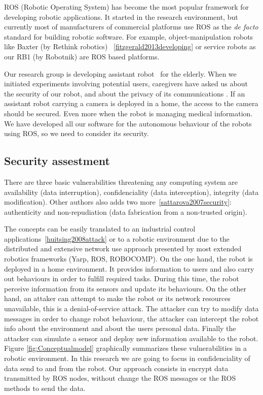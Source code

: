 \documentclass[journal,twoside]{JoPhA}
\begin{document}
ROS (Robotic Operating System) \cite{ROS09} has become the most popular framework for developing robotic applications. It started in the research environment, but currently most of manufacturers of commercial platforms use ROS as the {\em de facto} standard for building robotic software. For example, object-manipulation robots like Baxter (by Rethink robotics) ~\ref{fitzgerald2013developing} or service robots as our RB1 (by Robotnik) are ROS based platforms.

Our research group is developing assistant robot~\cite{Martin2014} for the elderly. When we initiated experiments involving potential users, caregivers have asked us about the security of our robot, and about the privacy of its communications \cite{Denning2009}. If an assistant robot carrying a camera is deployed in a home, the access to the camera should be secured. Even more when the robot is managing medical information. We have developed all our software for the autonomous behaviour of the robots using ROS, so we need to consider its security.

\subsection{Security assestment}

There are three basic vulnerabilities threatening any computing system are availability (data interruption), confidenciality (data interception), integrity (data modification). Other authors also  adds two more~\ref{sattarova2007security}: authenticity and non-repudiation (data fabrication from a non-trusted origin). 


The concepts can be easily translated to an industrial control applications~\ref{huitsing2008attack} or to a robotic environment due to the distributed and extensive network use approach presented by most extended robotics frameworks (Yarp, ROS, ROBOCOMP). On the one hand, the robot is deployed in a home environment. It provides information to users and also carry out behaviours in order to fulfill required tasks. During this time, the robot perceive information from its sensors and update its behaviours. 
On the other hand, an attaker can attempt to make the robot or its network resources unavailable, this is a denial-of-service attack. The attacker can try to modify data messages in order to change robot behaviour, the attacker can intercept the robot info about the environment and about the users personal data. Finally the attacker can simulate a sensor and deploy new information available to the robot. 
Figure \ref{fig:Conceptualmodel} graphically summarizes these vulnerabilities in a robotic environment. In this research we are going to focus in confidenciality of data send to and from the robot. Our approach consists in encrypt data transmitted by ROS nodes, without change the ROS messages or the ROS methods to send the data. 
\end{document}
